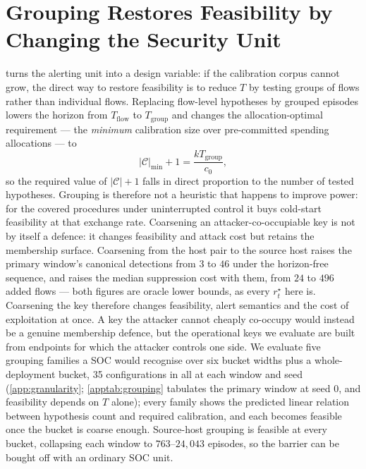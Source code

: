 \documentclass[conference]{IEEEtran}
\newcommand{\Cal}{\mathcal{C}}
\newcommand{\nCal}{\lvert\Cal\rvert}
\begin{document}
\section{Grouping Restores Feasibility by Changing the Security Unit}\label{sec:granularity}

 turns the alerting unit into a design variable: if the calibration corpus cannot grow,
the direct way to restore feasibility is to reduce $T$ by testing groups of flows rather than individual
flows. Replacing flow-level hypotheses by grouped episodes lowers the horizon from $T_{\mathrm{flow}}$
to $T_{\mathrm{group}}$ and changes the allocation-optimal requirement --- the \emph{minimum}
calibration size over pre-committed spending allocations --- to
\begin{equation}\label{eq:exchange}
\nCal_{\min}+1=\frac{kT_{\mathrm{group}}}{c_0},
\end{equation}
so the required value of $\nCal+1$ falls in direct proportion to the number of tested hypotheses.
Grouping is therefore not a heuristic that happens to improve power: for the covered procedures under
uninterrupted control it buys cold-start feasibility at that exchange rate. Coarsening an
attacker-co-occupiable key is not by itself a defence: it changes feasibility and attack cost but
retains the membership surface. Coarsening from the host pair to the source host raises the primary
window's canonical detections from $3$ to $46$ under the horizon-free sequence, and raises the median
suppression cost with them, from $24$ to $496$ added flows --- both figures are oracle lower bounds,
as every $r^{\star}_t$ here is. Coarsening the key therefore changes
feasibility, alert semantics and the cost of exploitation at once. A key the attacker cannot cheaply
co-occupy would instead be a genuine membership defence, but the operational keys we evaluate are
built from endpoints for which the attacker controls one side. We evaluate five grouping
families a SOC would recognise over six bucket widths plus a whole-deployment bucket, 35 configurations
in all at each window and seed (\cref{app:granularity}; \cref{apptab:grouping} tabulates the primary
window at seed 0, and feasibility depends on $T$ alone); every family shows the predicted linear relation between hypothesis count and required calibration, and
each becomes feasible once the bucket is coarse enough. Source-host
grouping is feasible at every bucket, collapsing each window to $763$--$24{,}043$ episodes, so the
barrier can be bought off with an ordinary SOC unit.
\end{document}
